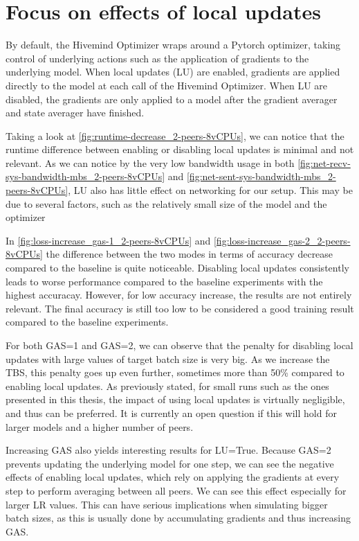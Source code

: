 \section{Focus on effects of local updates}\label{sec:focus-local-updates}
By default, the Hivemind Optimizer wraps around a Pytorch optimizer, taking control of underlying actions such as the application of gradients to the underlying model.
When local updates (LU) are enabled, gradients are applied directly to the model at each call of the Hivemind Optimizer.
When LU are disabled, the gradients are only applied to a model after the gradient averager and state averager have finished.

Taking a look at \autoref{fig:runtime-decrease_2-peers-8vCPUs}, we can notice that the runtime difference between enabling or disabling local updates is minimal and not relevant.
As we can notice by the very low bandwidth usage in both \autoref{fig:net-recv-sys-bandwidth-mbs_2-peers-8vCPUs} and \autoref{fig:net-sent-sys-bandwidth-mbs_2-peers-8vCPUs}, LU also has little effect on networking for our setup.
This may be due to several factors, such as the relatively small size of the model and the optimizer

In \autoref{fig:loss-increase_gas-1_2-peers-8vCPUs} and \autoref{fig:loss-increase_gas-2_2-peers-8vCPUs} the difference between the two modes in terms of accuracy decrease compared to the baseline is quite noticeable.
Disabling local updates consistently leads to worse performance compared to the baseline experiments with the highest accuracay.
However, for low accuracy increase, the results are not entirely relevant.
The final accuracy is still too low to be considered a good training result compared to the baseline experiments.

For both GAS=1 and GAS=2, we can observe that the penalty for disabling local updates with large values of target batch size is very big.
As we increase the TBS, this penalty goes up even further, sometimes more than 50\% compared to enabling local updates.
As previously stated, for small runs such as the ones presented in this thesis, the impact of using local updates is virtually negligible, and thus can be preferred.
It is currently an open question if this will hold for larger models and a higher number of peers.

Increasing GAS also yields interesting results for LU=True.
Because GAS=2 prevents updating the underlying model for one step, we can see the negative effects of enabling local updates, which rely on applying the gradients at every step to perform averaging between all peers.
We can see this effect especially for larger LR values.
This can have serious implications when simulating bigger batch sizes, as this is usually done by accumulating gradients and thus increasing GAS.

